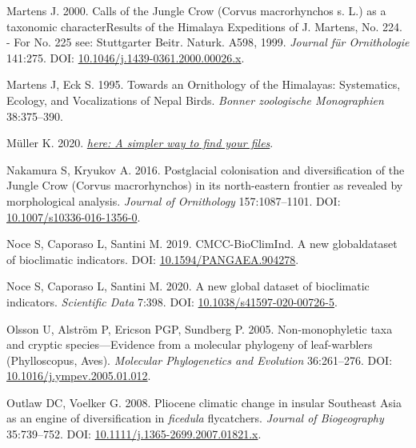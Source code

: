 \documentclass[10pt,a4paper]{article}
\newlength{\cslhangindent}
\newenvironment{CSLReferences}[2] %
 {\begin{list}{}{%
  \setlength{\itemindent}{0pt}
  \setlength{\leftmargin}{0pt}
  \setlength{\parsep}{0pt}
  \ifodd #1
   \setlength{\leftmargin}{\cslhangindent}
   \setlength{\itemindent}{-1\cslhangindent}
  \fi
  \setlength{\itemsep}{#2\baselineskip}}}
 {\end{list}}
\begin{document}
\begin{CSLReferences}{1}{0}
Martens J. 2000. Calls of the {Jungle} {Crow} ({Corvus} macrorhynchos s. L.) as a taxonomic {characterResults} of the {Himalaya} {Expeditions} of {J}. {Martens}, {No}. 224. - {For} {No}. 225 see: {Stuttgarter} {Beitr}. {Naturk}. {A598}, 1999. \emph{Journal für Ornithologie} 141:275. DOI: \href{https://doi.org/10.1046/j.1439-0361.2000.00026.x}{10.1046/j.1439-0361.2000.00026.x}.

Martens J, Eck S. 1995. Towards an {Ornithology} of the {Himalayas}: {Systematics}, {Ecology}, and {Vocalizations} of {Nepal} {Birds}. \emph{Bonner zoologische Monographien} 38:375--390.

Müller K. 2020. \emph{\href{https://CRAN.R-project.org/package=here}{{here}: A simpler way to find your files}}.

Nakamura S, Kryukov A. 2016. Postglacial colonisation and diversification of the {Jungle} {Crow} ({Corvus} macrorhynchos) in its north-eastern frontier as revealed by morphological analysis. \emph{Journal of Ornithology} 157:1087--1101. DOI: \href{https://doi.org/10.1007/s10336-016-1356-0}{10.1007/s10336-016-1356-0}.

Noce S, Caporaso L, Santini M. 2019. {CMCC}-{BioClimInd}. {A} new globaldataset of bioclimatic indicators. DOI: \href{https://doi.org/10.1594/PANGAEA.904278}{10.1594/PANGAEA.904278}.

Noce S, Caporaso L, Santini M. 2020. A new global dataset of bioclimatic indicators. \emph{Scientific Data} 7:398. DOI: \href{https://doi.org/10.1038/s41597-020-00726-5}{10.1038/s41597-020-00726-5}.

Olsson U, Alström P, Ericson PGP, Sundberg P. 2005. Non-monophyletic taxa and cryptic species---{Evidence} from a molecular phylogeny of leaf-warblers ({Phylloscopus}, {Aves}). \emph{Molecular Phylogenetics and Evolution} 36:261--276. DOI: \href{https://doi.org/10.1016/j.ympev.2005.01.012}{10.1016/j.ympev.2005.01.012}.

Outlaw DC, Voelker G. 2008. Pliocene climatic change in insular {Southeast} {Asia} as an engine of diversification in \emph{ficedula} flycatchers. \emph{Journal of Biogeography} 35:739--752. DOI: \href{https://doi.org/10.1111/j.1365-2699.2007.01821.x}{10.1111/j.1365-2699.2007.01821.x}.


\end{CSLReferences}
\end{document}
